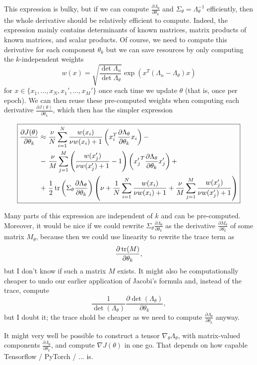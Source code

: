 \documentclass[a4paper]{article}
\begin{document}
This expression is bulky, but if we can compute $\frac{\partial \Lambda_\theta}{\partial \theta_k}$ and $\Sigma_\theta = \Lambda_\theta^{-1}$ efficiently, then the whole derivative should be relatively efficient to compute. Indeed, the expression mainly contains determinants of known matrices, matrix products of known matrices, and scalar products. Of course, we need to compute this derivative for each component $\theta_k$ but we can save resources by only computing the $k$-independent weights
$$w(x) = \sqrt{\frac{\det \Lambda_n}{\det \Lambda_\theta}} \exp\left(x^T (\Lambda_n - \Lambda_\theta){x}\right)$$
for $x \in \{ x_1,\ldots,x_N, x_1',\ldots,x_M'\}$ once each time we update $\theta$ (that is, once per epoch). We can then reuse these pre-computed weights when computing each derivative $\frac{\partial J(\theta)}{\partial \theta_k}$, which then has the simpler expression

$$\boxed{\begin{aligned}
\frac{\partial J(\theta)}{\partial \theta_k} \approx \ &\frac{\nu}{N} \sum_{i=1}^N \frac{w(x_i)}{\nu w(x_i) + 1} \left(x_i^T \frac{\partial \Lambda_\theta}{\partial \theta_k} x_i\right) -\\
- \ &\frac{\nu}{M} \sum_{j=1}^M \left( \frac{w(x_j')}{\nu w(x_j') +  1} - 1\right)  \left( {x_j'}^T  \frac{\partial \Lambda_\theta}{\partial \theta_k} {x_j'} \right)+\\
+ \ &\frac{1}{2}\tr\left( \Sigma_\theta \frac{\partial \Lambda_\theta}{\partial\theta_k}\right) \left(\nu +  \frac{1}{N} \sum_{i=1}^N \frac{w(x_i)}{\nu w(x_i) + 1} + \frac{\nu}{M} \sum_{j=1}^M \frac{w(x_j')}{\nu w(x_j') + 1}\right)
\end{aligned}}$$

Many parts of this expression are independent of $k$ and can be pre-computed. Moreover, it would be nice if we could rewrite $ \Sigma_\theta \frac{\partial \Lambda_\theta}{\partial\theta_k}$ as the derivative $\frac{\partial M_\theta}{\partial \theta_k}$ of some matrix $M_\theta$, because then we could use linearity to rewrite the trace term as
$$\frac{\partial  \tr(M)}{\partial \theta_k},$$
but I don't know if such a matrix $M$ exists. It might also be computationally cheaper to undo our earlier application of Jacobi's formula and, instead of the trace, compute
$$\frac{1}{\det (\Lambda_\theta)} \frac{\partial \det( \Lambda_\theta)}{\partial \theta_k},$$
but I doubt it; the trace shold be cheaper as we need to compute $\frac{\partial \Lambda_\theta}{\partial \theta_k}$ anyway.

It might very well be possible to construct a tensor $\nabla_\theta \Lambda_\theta$, with matrix-valued components $\frac{\partial \Lambda_\theta}{\partial \theta_k}$, and compute $\nabla J(\theta)$ in one go. That depends on how capable Tensorflow / PyTorch / ... is.
\end{document}
